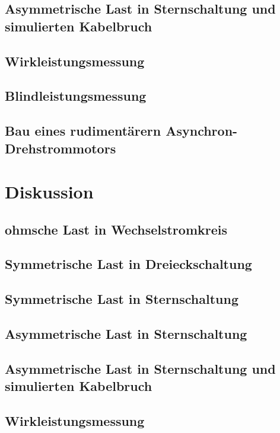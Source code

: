 \documentclass[12pt,english,ngerman]{scrartcl}
\begin{document}
\subsection{Asymmetrische Last in Sternschaltung und simulierten Kabelbruch}


\subsection{Wirkleistungsmessung}


\subsection{Blindleistungsmessung}


\subsection{Bau eines rudimentärern Asynchron-Drehstrommotors}


\section{Diskussion}
\label{sec:diskussion}

\subsection{ohmsche Last in Wechselstromkreis}


\subsection{Symmetrische Last in Dreieckschaltung}


\subsection{Symmetrische Last in Sternschaltung}


\subsection{Asymmetrische Last in Sternschaltung}


\subsection{Asymmetrische Last in Sternschaltung und simulierten Kabelbruch}


\subsection{Wirkleistungsmessung}
\end{document}
